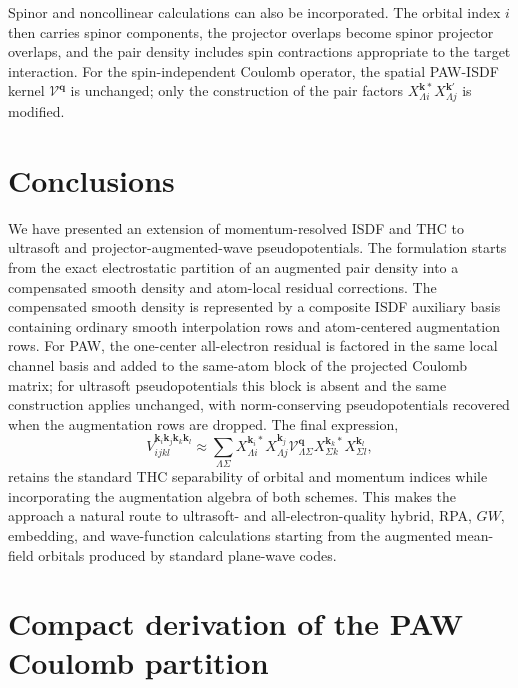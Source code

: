 \documentclass[aps,prb,reprint,superscriptaddress,longbibliography,nofootinbib]{revtex4-2}
\newcommand{\bk}{\mathbf k}
\newcommand{\bq}{\mathbf q}
\begin{document}
Spinor and noncollinear calculations can also be incorporated.  The orbital index \(i\) then carries spinor components, the projector overlaps become spinor projector overlaps, and the pair density includes spin contractions appropriate to the target interaction.  For the spin-independent Coulomb operator, the spatial PAW-ISDF kernel \(\mathcal V^{\bq}\) is unchanged; only the construction of the pair factors \(X_{\Lambda i}^{\bk *}X_{\Lambda j}^{\bk'}\) is modified.

\section{Conclusions}
\label{sec:conclusion}

We have presented an extension of momentum-resolved ISDF and THC to ultrasoft and projector-augmented-wave pseudopotentials.  The formulation starts from the exact electrostatic partition of an augmented pair density into a compensated smooth density and atom-local residual corrections.  The compensated smooth density is represented by a composite ISDF auxiliary basis containing ordinary smooth interpolation rows and atom-centered augmentation rows.  For PAW, the one-center all-electron residual is factored in the same local channel basis and added to the same-atom block of the projected Coulomb matrix; for ultrasoft pseudopotentials this block is absent and the same construction applies unchanged, with norm-conserving pseudopotentials recovered when the augmentation rows are dropped.  The final expression,
\begin{equation}
V_{ijkl}^{\bk_i\bk_j\bk_k\bk_l}
\approx
\sum_{\Lambda\Sigma}
X_{\Lambda i}^{\bk_i *}X_{\Lambda j}^{\bk_j}
\mathcal V_{\Lambda\Sigma}^{\bq}
X_{\Sigma k}^{\bk_k *}X_{\Sigma l}^{\bk_l},
\label{eq:conclusion-formula}
\end{equation}
retains the standard THC separability of orbital and momentum indices while incorporating the augmentation algebra of both schemes.  This makes the approach a natural route to ultrasoft- and all-electron-quality hybrid, RPA, \(GW\), embedding, and wave-function calculations starting from the augmented mean-field orbitals produced by standard plane-wave codes.

\appendix

\section{Compact derivation of the PAW Coulomb partition}
\label{app:pawpartition}
\end{document}
